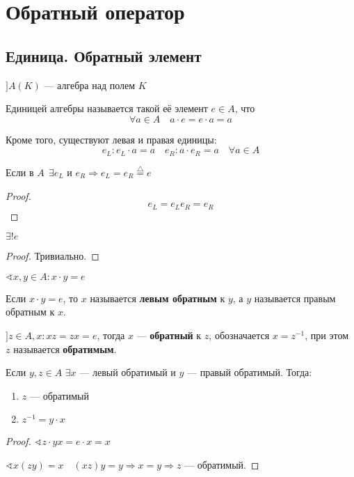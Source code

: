 

\cfoot{}



\section{Обратный оператор}

\subsection{Единица. Обратный элемент}

$] A(K)$ --- алгебра над полем $K$

\begin{definition}
    Единицей алгебры называется такой её элемент $e\in A$, что
    $$\forall a\in A \quad a\cdot e = e\cdot a = a$$
\end{definition}

Кроме того, существуют левая и правая единицы:
$$e_L : e_L\cdot a = a \quad e_R : a\cdot e_R = a \quad \forall a\in A$$

\begin{lemma}
    Если в $A \ \ \exists e_L$ и  $e_R \Rightarrow e_L=e_R\stackrel{\triangle}{=} e$
\end{lemma}
\begin{proof}
    $$e_L=e_Le_R=e_R$$
\end{proof}

\begin{lemma}
    $\exists!e$
\end{lemma}
\begin{proof}
    Тривиально.
\end{proof}

$\sphericalangle x,y\in A : x\cdot y = e$
\begin{definition}
    Если $x\cdot y = e$, то $x$ называется \textbf{левым обратным} к $y$, а $y$ называется правым обратным к $x$.
\end{definition}

\begin{definition}
    $] z\in A, x : xz=zx=e$, тогда $x$ --- \textbf{обратный} к $z$, обозначается $x=z^{-1}$, при этом $z$ называется \textbf{обратимым}.
\end{definition}

\begin{lemma}
    Если $y, z\in A$ $\exists x$ --- левый обратимый и $y$ --- правый обратимый. Тогда:
    \begin{enumerate}
        \item $z$ --- обратимый
        \item $z^{-1}=y\cdot x$
    \end{enumerate}
\end{lemma}
\begin{proof}
    $\sphericalangle z\cdot yx=e\cdot x=x$

    $\sphericalangle x(zy)=x \quad (xz)y=y \Rightarrow x=y \Rightarrow z$ --- обратимый.
\end{proof}

